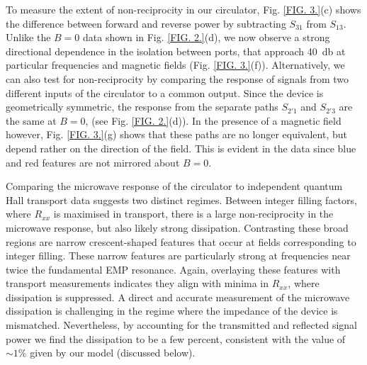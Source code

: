 To measure the extent of non-reciprocity in our circulator, Fig. \ref{FIG. 3.}(c) shows the difference between forward and reverse power by subtracting $S_{31}$ from $S_{13}$. Unlike the $B = 0$ data shown in Fig. \ref{FIG. 2.}(d), we now observe a strong directional dependence in the isolation between ports, that approach \SI{40}{\decibel} at particular frequencies and magnetic fields (Fig. \ref{FIG. 3.}(f)). Alternatively, we can also test for non-reciprocity by comparing the response of signals from two different inputs of the circulator to a common output. Since the device is geometrically symmetric, the response from the separate paths $S_{2'1}$ and $S_{2'3}$ are the same at $B = 0$, (see Fig. \ref{FIG. 2.}(d)). In the presence of a magnetic field however, Fig. \ref{FIG. 3.}(g) shows that these paths are no longer equivalent, but depend rather on the direction of the field. This is evident in the data since blue and red features are not mirrored about $B = 0$. 

Comparing the microwave response of the circulator to independent quantum Hall transport data suggests  two distinct regimes. Between integer filling factors, where $R_{xx}$ is maximised in transport, there is a large non-reciprocity in the microwave response, but also likely strong dissipation. Contrasting these broad regions are narrow crescent-shaped features that occur at fields corresponding to integer filling. These narrow features are particularly strong at frequencies near twice the fundamental EMP resonance. Again, overlaying these features with transport measurements indicates they align with minima in $R_{xx}$, where dissipation is suppressed. A direct and accurate measurement of the microwave dissipation is challenging in the regime where the impedance of the device is mismatched. Nevertheless, by accounting for the transmitted and reflected signal power we find the dissipation to be a few percent, consistent with the value of $\sim 1\%$ given by our model (discussed below).

